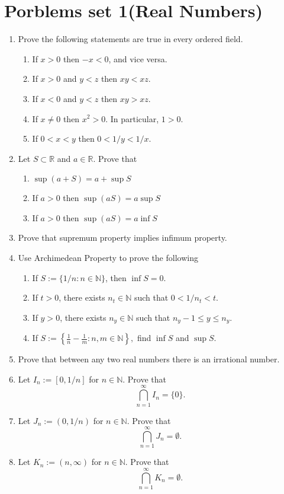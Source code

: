 \documentclass[12pt]{article}
\begin{document}
\section{Porblems set 1(Real Numbers)}

\begin{enumerate}

    \item Prove the following statements are true in every ordered field.

    \begin{enumerate}
        \item If $x > 0$ then $-x < 0$, and vice versa.
        \item If $x > 0$ and $y < z$ then $xy < xz$.
        \item If $x < 0$ and $y < z$ then $xy > xz$.
        \item If $x \neq 0$ then $x^2 > 0$. In particular, $1 > 0$.
        \item If $0 < x < y$ then $0 < 1/y < 1/x$.
    \end{enumerate}

    \item Let $S\subset\mathbb{R}$ and $a\in\mathbb{R}$. Prove that
    \begin{enumerate}
        \item $\sup (a+S)=a+\sup S$
        \item If $a>0$ then $\sup (aS)=a\sup S$
        \item If $a>0$ then $\sup (aS)=a\inf S$
    \end{enumerate}
    \item Prove that supremum property implies infimum property.
    \item Use Archimedean Property to prove the following
    \begin{enumerate}
        \item If $S := \{1/n : n \in \mathbb{N}\}$, then $\inf S = 0$.
        \item If $t > 0$, there exists $n_t \in \mathbb{N}$ such that $0 < 1/n_t < t$.
        \item If $y > 0$, there exists $n_y \in \mathbb{N}$ such that $n_y - 1 \leq y \leq n_y$.
        \item If \( S := \left\{ \frac{1}{n} - \frac{1}{m} : n, m \in \mathbb{N} \right\}, \) find \( \inf S \) and \( \sup S \).
    \end{enumerate}
    \item Prove that between any two real numbers there is an irrational number.
    \item Let \( I_n := [0, 1/n] \) for \( n \in \mathbb{N} \). Prove that
    \[
    \bigcap_{n=1}^{\infty} I_n = \{0\}.
    \]

    \item Let \( J_n := (0, 1/n) \) for \( n \in \mathbb{N} \). Prove that
    \[
    \bigcap_{n=1}^{\infty} J_n = \emptyset.
    \]

    \item Let \( K_n := (n, \infty) \) for \( n \in \mathbb{N} \). Prove that
    \[
    \bigcap_{n=1}^{\infty} K_n = \emptyset.
    \]

\end{enumerate}
\end{document}
